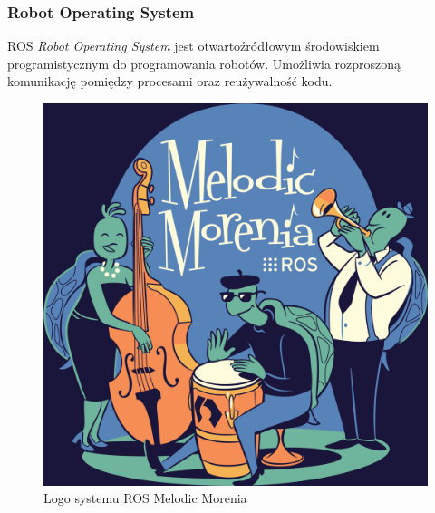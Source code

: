 
\begin{frame}
	\frametitle{Robot Operating System}
	\begin{block}{ROS}
		\textit{Robot Operating System} jest otwartoźródłowym środowiskiem programistycznym do programowania robotów.
		Umożliwia rozproszoną komunikację pomiędzy procesami oraz reużywalność kodu.
	\end{block}
	\medskip
	\begin{figure}
		\includegraphics[scale=0.2]{./images/ros-melodic.png}
		\caption{Logo systemu ROS Melodic Morenia}
	\end{figure}
\end{frame}


